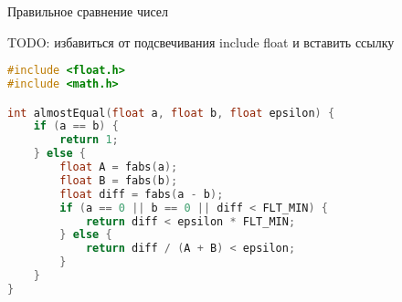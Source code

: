 \begin{frame}[fragile]{Правильное сравнение чисел}

  TODO: избавиться от подсвечивания include float
  и вставить ссылку

  \begin{lstlisting}[language=C++,basicstyle=\footnotesize\ttfamily]
#include <float.h>
#include <math.h>

int almostEqual(float a, float b, float epsilon) {
    if (a == b) {
        return 1;
    } else {
        float A = fabs(a);
        float B = fabs(b);
        float diff = fabs(a - b);
        if (a == 0 || b == 0 || diff < FLT_MIN) {
            return diff < epsilon * FLT_MIN;
        } else {
            return diff / (A + B) < epsilon;
        }
    }
}
  \end{lstlisting}

\end{frame}



